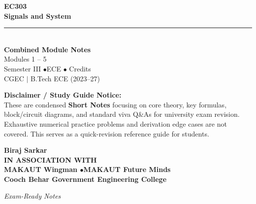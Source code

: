 \documentclass[12pt,a4paper]{article}
\begin{document}
\thispagestyle{empty}


\vspace*{1.0cm}
\begin{center}
  {\Huge\bfseries\color{myred} EC303}\\[10pt]
  {\LARGE\bfseries\color{mydark} Signals and System}\\[20pt]
  {\color{myred}\rule{0.7\linewidth}{1.5pt}}\\[18pt]
  {\Large\color{myteal}\textbf{Combined Module Notes}}\\[8pt]
  {\large\color{mydark} Modules 1 -- 5}\\[40pt]
  {\normalsize\color{mydark} Semester III \quad$\bullet$\quad ECE \quad$\bullet$ Credits}\\[12pt]
  {\normalsize\color{mydark} CGEC \;$|$\; B.Tech ECE (2023--27)}
\end{center}
\vspace{1.0cm}
\begin{center}
  \begin{tcolorbox}[colback=mygray, colframe=mgframe, boxrule=0.5pt, arc=3pt, width=0.85\linewidth]
    \centering\small\color{mydark}
    \textbf{Disclaimer / Study Guide Notice:}\\
    These are condensed \textbf{Short Notes} focusing on core theory, key formulas, block/circuit diagrams, and standard viva Q\&As for university exam revision. Exhaustive numerical practice problems and derivation edge cases are not covered. This serves as a quick-revision reference guide for students.
  \end{tcolorbox}
\end{center}
\vfill
\vspace{0.6cm}
\begin{center}
  {\large\bfseries\color{mypurple} Biraj Sarkar}\\[16pt]
  {\footnotesize\color{watermark}\textbf{IN ASSOCIATION WITH}}\\[8pt]
  {\small\bfseries\color{mydark} MAKAUT Wingman \quad$\bullet$\quad MAKAUT Future Minds}\\[12pt]
  {\large\bfseries\color{myteal} Cooch Behar Government Engineering College}
\end{center}
\vfill
\begin{center}{\small\color{watermark}\textit{Exam-Ready Notes}}\end{center}
\clearpage
\end{document}
